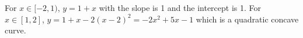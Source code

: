 \documentclass[10pt]{article}
\begin{document}
For $x \in [-2, 1)$, $y=1+x$ with the slope is 1 and the intercept is 1. For $x \in [1,2]$, $y=1+x-2(x-2)^2=-2x^2+5x-1$ which is a quadratic concave curve.
\end{document}
